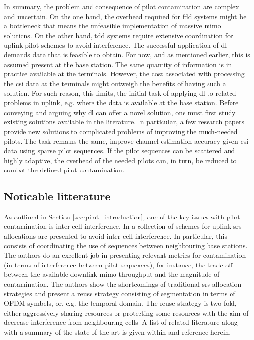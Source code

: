 In summary, the problem and consequence of pilot contamination are complex and uncertain. On the one hand, the overhead required for \gls{fdd} systems might be a bottleneck that means the unfeasible implementation of massive \gls{mimo} solutions. On the other hand, \gls{tdd} systems require extensive coordination for uplink pilot schemes to avoid interference. The successful application of \acrfull{dl} demands data that is feasible to obtain. For now, and as mentioned earlier, this is assumed present at the base station. The same quantity of information is in practice available at the terminals. However, the cost associated with processing the \gls{csi} data at the terminals might outweigh the benefits of having such a solution. For such reason, this limits, the initial task of applying \acrlong{dl} to related problems in uplink, e.g. where the data is available at the base station. Before conveying and arguing why \acrlong{dl} can offer a novel solution, one must first study existing solutions available in the literature. In particular, a few research papers provide new solutions to complicated problems of improving the much-needed pilots. The task remains the same, improve channel estimation accuracy given \gls{csi} data using sparse pilot sequences. If the pilot sequences can be scattered and highly adaptive, the overhead of the needed pilots can, in turn, be reduced to combat the defined pilot contamination. 

\subsection{Noticable litterature}
As outlined in Section \ref{sec:pilot_introduction}, one of the key-issues with pilot contamination is inter-cell interference. In \cite{Galati2017UplinkMIMO} a collection of schemes for uplink \gls{srs} allocations are presented to avoid inter-cell interference. In particular, this consists of coordinating the use of sequences between neighbouring base stations. The authors do an excellent job in presenting relevant metrics for contamination (in terms of interference between pilot sequences), for instance, the trade-off between the available downlink \gls{mimo} throughput and the magnitude of contamination. The authors show the shortcomings of traditional \gls{srs} allocation strategies and present a reuse strategy consisting of segmentation in terms of OFDM symbols, or, e.g. the temporal domain. The reuse strategy is two-fold, either aggressively sharing resources or protecting some resources with the aim of decrease interference from neighbouring cells. A list of related literature along with a summary of the state-of-the-art is given within \cite{Galati2017UplinkMIMO} and reference herein.

